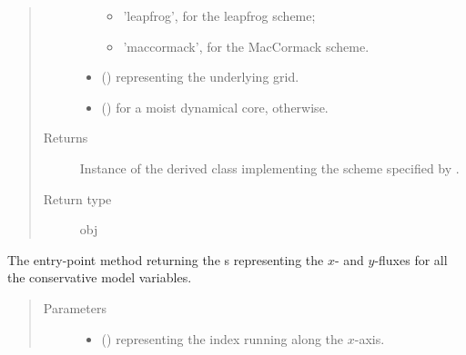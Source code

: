 \documentclass[letterpaper,10pt,english]{sphinxmanual}
\begin{document}
\begin{fulllineitems}
\begin{fulllineitems}
\begin{quote}
\begin{description}
\begin{itemize}
\begin{itemize}
\item {} 
’leapfrog’, for the leapfrog scheme;

\item {} 
’maccormack’, for the MacCormack scheme.

\end{itemize}


\item {} 
 () \textendash{} {\hyperref[\detokenize{api:grids.grid_xyz.GridXYZ}]{}} representing the underlying grid.

\item {} 
 () \textendash{}  for a moist dynamical core,  otherwise.

\end{itemize}

\item[{Returns}] \leavevmode
Instance of the derived class implementing the scheme specified by .

\item[{Return type}] \leavevmode
obj

\end{description}\end{quote}

\end{fulllineitems}


\begin{fulllineitems}
\label{\detokenize{api:dycore.flux_isentropic.FluxIsentropic.get_fluxes}}
The entry-point method returning the s representing the \(x\)- and
\(y\)-fluxes for all the conservative model variables.
\begin{quote}\begin{description}
\item[{Parameters}] \leavevmode\begin{itemize}
\item {} 
 () \textendash{}  representing the index running along the \(x\)-axis.


\end{itemize}
\end{description}
\end{quote}
\end{fulllineitems}
\end{fulllineitems}
\end{document}
